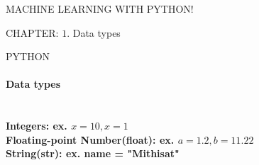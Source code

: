 \documentclass[11pt]{article}
\begin{document}
\begin{center}
MACHINE LEARNING WITH PYTHON!
\end{center}
CHAPTER: $1.$ Data types
\newpage
\begin{center}
PYTHON
\end{center}
\paragraph{Data types}
\paragraph{\\Integers: ex. $x = 10 , x = 1$\\[1pt]Floating-point Number(float): ex. $a = 1.2 , b = 11.22$ 
\\[1pt]String(str): ex. name = "Mithisat"}
\end{document}

